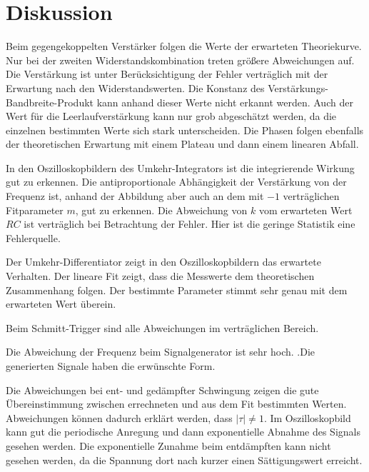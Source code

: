 \section{Diskussion}
\label{sec:Diskussion}

Beim gegengekoppelten Verstärker folgen die Werte der erwarteten Theoriekurve. Nur bei der zweiten Widerstandskombination treten größere Abweichungen auf. Die Verstärkung ist unter Berücksichtigung der Fehler verträglich mit der Erwartung nach den Widerstandswerten. Die Konstanz des Verstärkungs-Bandbreite-Produkt kann anhand dieser Werte nicht erkannt werden. Auch der Wert für die Leerlaufverstärkung kann nur grob abgeschätzt werden, da die einzelnen bestimmten Werte sich stark unterscheiden. Die Phasen folgen ebenfalls der theoretischen Erwartung mit einem Plateau und dann einem linearen Abfall.

In den Oszilloskopbildern des Umkehr-Integrators ist die integrierende Wirkung gut zu erkennen. Die antiproportionale Abhängigkeit der Verstärkung von der Frequenz ist, anhand der Abbildung aber auch an dem mit $-1$ verträglichen Fitparameter $m$, gut zu erkennen. Die Abweichung von $k$ vom erwarteten Wert $RC$ ist verträglich bei Betrachtung der Fehler. Hier ist die geringe Statistik eine Fehlerquelle.

Der Umkehr-Differentiator zeigt in den Oszilloskopbildern das erwartete Verhalten. Der lineare Fit zeigt, dass die Messwerte dem theoretischen Zusammenhang folgen. Der bestimmte Parameter stimmt sehr genau mit dem erwarteten Wert überein.

Beim Schmitt-Trigger sind alle Abweichungen im verträglichen Bereich.

Die Abweichung der Frequenz beim Signalgenerator ist sehr hoch. .Die generierten Signale haben die erwünschte Form.

Die Abweichungen bei ent- und gedämpfter Schwingung zeigen die gute Übereinstimmung zwischen errechneten und aus dem Fit bestimmten Werten. Abweichungen können dadurch erklärt werden, dass $|\tau| \neq 1$. Im Oszilloskopbild kann gut die periodische Anregung und dann exponentielle Abnahme des Signals gesehen werden. Die exponentielle Zunahme beim entdämpften kann nicht gesehen werden, da die Spannung dort nach kurzer einen Sättigungswert erreicht.
